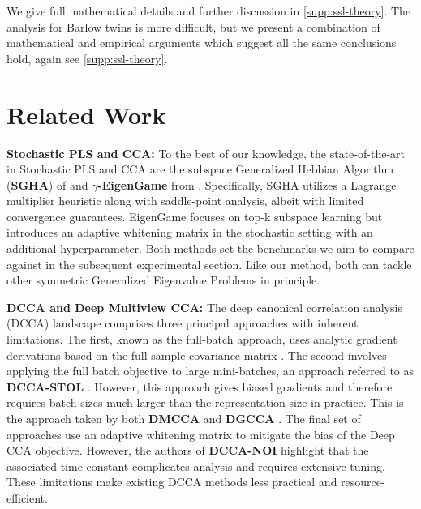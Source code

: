 We give full mathematical details and further discussion in \cref{supp:ssl-theory}.
The analysis for Barlow twins is more difficult, but we present a combination of mathematical and empirical arguments which suggest all the same conclusions hold, again see \cref{supp:ssl-theory}.

\section{Related Work}\label{sec:related-work}

\textbf{Stochastic PLS and CCA:}
To the best of our knowledge, the state-of-the-art in Stochastic PLS and CCA are the subspace Generalized Hebbian Algorithm (\textbf{SGHA}) of \cite{chen2019constrained} and \textbf{$\gamma$-EigenGame} from \cite{gemp20,gemp2021}. Specifically, SGHA utilizes a Lagrange multiplier heuristic along with saddle-point analysis, albeit with limited convergence guarantees. EigenGame focuses on top-k subspace learning but introduces an adaptive whitening matrix in the stochastic setting with an additional hyperparameter. Both methods set the benchmarks we aim to compare against in the subsequent experimental section. Like our method, both can tackle other symmetric Generalized Eigenvalue Problems in principle.

\textbf{DCCA and Deep Multiview CCA:}
The deep canonical correlation analysis (DCCA) landscape comprises three principal approaches with inherent limitations. The first, known as the full-batch approach, uses analytic gradient derivations based on the full sample covariance matrix \citep{andrew2013deep}.
The second involves applying the full batch objective to large mini-batches, an approach referred to as \textbf{DCCA-STOL} \citep{wang2015unsupervised}. However, this approach gives biased gradients and therefore requires batch sizes much larger than the representation size in practice. This is the approach taken by both \textbf{DMCCA} \citep{somandepalli2019multimodal} and \textbf{DGCCA} \citep{benton2017deep} . The final set of approaches use an adaptive whitening matrix \citep{wang2015stochastic, chang2018scalable} to mitigate the bias of the Deep CCA objective. However, the authors of \textbf{DCCA-NOI} highlight that the associated time constant complicates analysis and requires extensive tuning. These limitations make existing DCCA methods less practical and resource-efficient.


